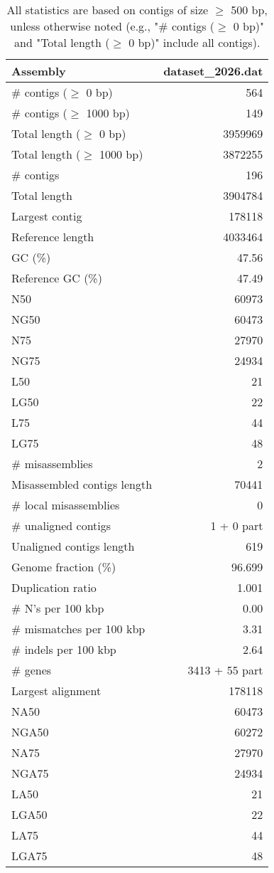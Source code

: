 \documentclass[12pt,a4paper]{article}
\begin{document}
\begin{table}[ht]
\begin{center}
\caption{All statistics are based on contigs of size $\geq$ 500 bp, unless otherwise noted (e.g., "\# contigs ($\geq$ 0 bp)" and "Total length ($\geq$ 0 bp)" include all contigs).}
\begin{tabular}{|l*{1}{|r}|}
\hline
Assembly & dataset\_2026.dat \\ \hline
\# contigs ($\geq$ 0 bp) & 564 \\ \hline
\# contigs ($\geq$ 1000 bp) & 149 \\ \hline
Total length ($\geq$ 0 bp) & 3959969 \\ \hline
Total length ($\geq$ 1000 bp) & 3872255 \\ \hline
\# contigs & 196 \\ \hline
Total length & 3904784 \\ \hline
Largest contig & 178118 \\ \hline
Reference length & 4033464 \\ \hline
GC (\%) & 47.56 \\ \hline
Reference GC (\%) & 47.49 \\ \hline
N50 & 60973 \\ \hline
NG50 & 60473 \\ \hline
N75 & 27970 \\ \hline
NG75 & 24934 \\ \hline
L50 & 21 \\ \hline
LG50 & 22 \\ \hline
L75 & 44 \\ \hline
LG75 & 48 \\ \hline
\# misassemblies & 2 \\ \hline
Misassembled contigs length & 70441 \\ \hline
\# local misassemblies & 0 \\ \hline
\# unaligned contigs & 1 + 0 part \\ \hline
Unaligned contigs length & 619 \\ \hline
Genome fraction (\%) & 96.699 \\ \hline
Duplication ratio & 1.001 \\ \hline
\# N's per 100 kbp & 0.00 \\ \hline
\# mismatches per 100 kbp & 3.31 \\ \hline
\# indels per 100 kbp & 2.64 \\ \hline
\# genes & 3413 + 55 part \\ \hline
Largest alignment & 178118 \\ \hline
NA50 & 60473 \\ \hline
NGA50 & 60272 \\ \hline
NA75 & 27970 \\ \hline
NGA75 & 24934 \\ \hline
LA50 & 21 \\ \hline
LGA50 & 22 \\ \hline
LA75 & 44 \\ \hline
LGA75 & 48 \\ \hline
\end{tabular}
\end{center}
\end{table}
\end{document}
